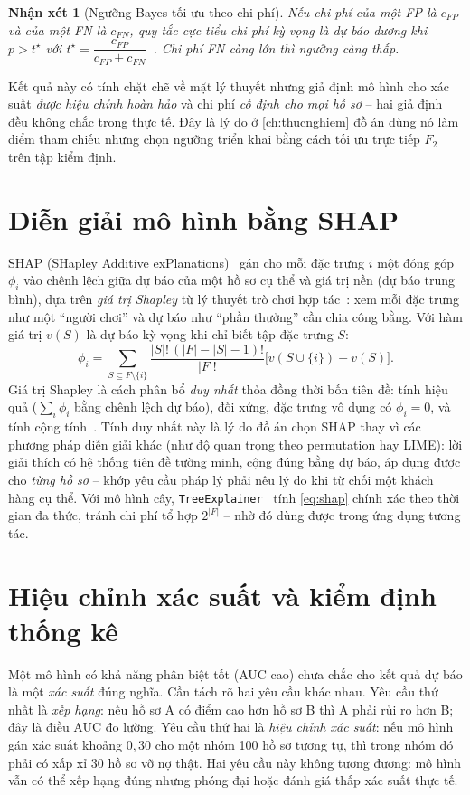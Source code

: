 \documentclass[12pt,a4paper,oneside]{report}
\theoremstyle{vnplain}
\theoremstyle{vndef}
\newtheorem{nhanxet}[dlytheo]{Nhận xét}
\begin{document}
\begin{nhanxet}[Ngưỡng Bayes tối ưu theo chi phí]\label{nx:bayes}
Nếu chi phí của một FP là $c_{FP}$ và của một FN là $c_{FN}$, quy tắc cực tiểu chi phí kỳ
vọng là dự báo dương khi $p>t^\star$ với
$t^\star=\dfrac{c_{FP}}{c_{FP}+c_{FN}}$~\cite{elkan2001}. Chi phí FN càng lớn thì ngưỡng
càng thấp.
\end{nhanxet}

Kết quả này có tính chặt chẽ về mặt lý thuyết nhưng giả định mô hình cho xác suất \emph{được hiệu chỉnh hoàn hảo} và
chi phí \emph{cố định cho mọi hồ sơ} -- hai giả định đều không chắc trong thực tế. Đây là
lý do ở \cref{ch:thucnghiem} đồ án dùng nó làm điểm tham chiếu nhưng chọn ngưỡng triển
khai bằng cách tối ưu trực tiếp $F_2$ trên tập kiểm định.

\section{Diễn giải mô hình bằng SHAP}\label{sec:shap}
SHAP (SHapley Additive exPlanations)~\cite{lundberg2017} gán cho mỗi đặc trưng $i$ một
đóng góp $\phi_i$ vào chênh lệch giữa dự báo của một hồ sơ cụ thể và giá trị nền (dự báo
trung bình), dựa trên \emph{giá trị Shapley} từ lý thuyết trò chơi hợp
tác~\cite{shapley1953}: xem mỗi đặc trưng như một ``người chơi'' và dự báo như ``phần
thưởng'' cần chia công bằng. Với hàm giá trị $v(S)$ là dự báo kỳ vọng khi chỉ biết tập
đặc trưng $S$:
\begin{equation}
  \phi_i=\sum_{S\subseteq F\setminus\{i\}}\frac{|S|!\,(|F|-|S|-1)!}{|F|!}
  \big[v(S\cup\{i\})-v(S)\big].
  \label{eq:shap}
\end{equation}
Giá trị Shapley là cách phân bổ \emph{duy nhất} thỏa đồng thời bốn tiên đề: tính hiệu quả
($\sum_i\phi_i$ bằng chênh lệch dự báo), đối xứng, đặc trưng vô dụng có $\phi_i=0$, và tính
cộng tính~\cite{shapley1953,molnar2020}. Tính duy nhất này là lý do đồ án chọn SHAP thay
vì các phương pháp diễn giải khác (như độ quan trọng theo permutation hay LIME): lời giải
thích có hệ thống tiên đề tường minh, cộng đúng bằng dự báo, áp dụng được cho \emph{từng hồ sơ}
-- khớp yêu cầu pháp lý phải nêu lý do khi từ chối một khách hàng cụ thể. Với mô hình cây,
\texttt{TreeExplainer}~\cite{lundberg2020} tính \cref{eq:shap} chính xác theo thời gian đa
thức, tránh chi phí tổ hợp $2^{|F|}$ -- nhờ đó dùng được trong ứng dụng tương tác.

\section{Hiệu chỉnh xác suất và kiểm định thống kê}\label{sec:calib}
Một mô hình có khả năng phân biệt tốt (AUC cao) chưa chắc cho kết quả dự báo là một \emph{xác suất} đúng nghĩa. Cần tách rõ hai yêu cầu khác nhau. Yêu cầu thứ nhất là \emph{xếp hạng}: nếu hồ sơ A có điểm cao hơn hồ sơ B thì A phải rủi ro hơn B; đây là điều AUC đo lường. Yêu cầu thứ hai là \emph{hiệu chỉnh xác suất}: nếu mô hình gán xác suất khoảng $0{,}30$ cho một nhóm 100 hồ sơ tương tự, thì trong nhóm đó phải có xấp xỉ 30 hồ sơ vỡ nợ thật. Hai yêu cầu này không tương đương: mô hình vẫn có thể xếp hạng đúng nhưng phóng đại hoặc đánh giá thấp xác suất thực tế.
\end{document}
